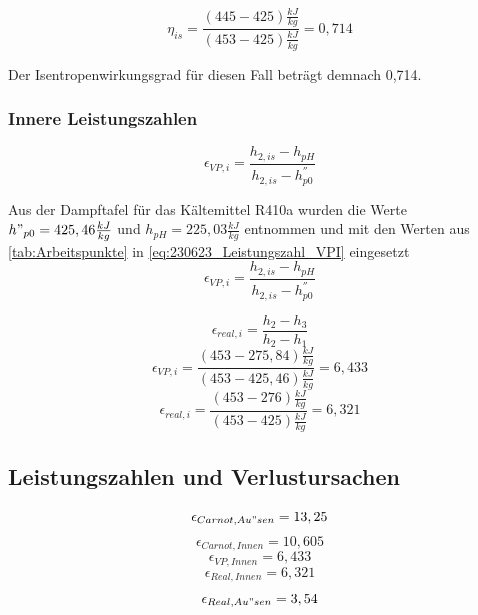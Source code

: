 $$\eta_{is}=\frac{(445-425)\frac{kJ}{kg}}{(453-425)\frac{kJ}{kg}}=0,714$$

Der Isentropenwirkungsgrad für diesen Fall beträgt demnach 0,714.\\


\subsubsection{Innere Leistungszahlen}

\begin{equation}
   \epsilon_{VP,i} = \frac{h_{2,is}-h_{pH}}{h_{2,is}-h^{''}_{p0}}
\label{eq:230623_Leistungszahl_VPI}
\end{equation}

Aus der Dampftafel für das Kältemittel R410a wurden die Werte $h"_{p0}=425,46 \frac{kJ}{kg}$ und $h_{pH}= 225,03 \frac{kJ}{kg}$ entnommen und mit den Werten aus \autoref{tab:Arbeitspunkte} in \autoref{eq:230623_Leistungszahl_VPI} eingesetzt
$$\epsilon_{VP,i} = \frac{h_{2,is}-h_{pH}}{h_{2,is}-h^{''}_{p0}}$$

\begin{equation}
    \epsilon_{real,i}= \frac{h_2-h_3}{h_2-h_1}
\end{equation}
$$\epsilon_{VP,i}= \frac{(453-275,84)\frac{kJ}{kg}}{(453-425,46)\frac{kJ}{kg}} = 6,433 $$
$$\epsilon_{real,i}= \frac{(453-276)\frac{kJ}{kg}}{(453-425)\frac{kJ}{kg}} = 6,321 $$

\subsection{Leistungszahlen und Verlustursachen}


$$\epsilon_{Carnot,Au"sen} = 13,25$$
$$\epsilon_{Carnot,Innen} = 10,605$$
$$\epsilon_{VP,Innen} = 6,433$$
$$\epsilon_{Real,Innen} = 6,321$$
$$\epsilon_{Real,Au"sen} = 3,54$$

